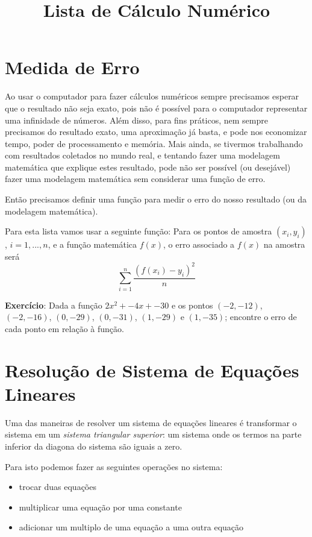 \documentclass[12pt]{article}
\title{Lista de Cálculo Numérico}
\date{}
\begin{document}
\maketitle


\vspace{3em}

\section{Medida de Erro}

Ao usar o computador para fazer cálculos numéricos sempre precisamos esperar que o resultado não seja exato, pois não é possível para o computador representar uma infinidade de números. Além disso, para fins práticos, nem sempre precisamos do resultado exato, uma aproximação já basta, e pode nos economizar tempo, poder de processamento e memória. Mais ainda, se tivermos trabalhando com resultados coletados no mundo real, e tentando fazer uma modelagem matemática que explique estes resultado, pode não ser possível (ou desejável) fazer uma modelagem matemática sem considerar uma função de erro.

Então precisamos definir uma função para medir o erro do nosso resultado (ou da modelagem matemática).

Para esta lista vamos usar a seguinte função: 
Para os pontos de amostra $(x_i, y_i)$, $i = 1, ..., n$, e a função matemática $f(x)$, o erro associado a $f(x)$ na amostra será
\[\sum_{i=1}^{n}\frac{(f(x_i) - y_i)^2}{n}\]

\textbf{Exercício}: Dada a função $2x^2 + -4x + -30$ e os pontos $(-2, -12)$, $(-2, -16)$, $(0, -29)$, $(0, -31)$, $(1, -29)$ e $(1, -35)$; encontre o erro de cada ponto em relação à função.



\break





\section{Resolução de Sistema de Equações Lineares}

Uma das maneiras de resolver um sistema de equações lineares é transformar o sistema em um \textit{sistema triangular superior}: um sistema onde os termos na parte inferior da diagona do sistema são iguais a zero.

Para isto podemos fazer as seguintes operações no sistema:
\begin{itemize}
\item trocar duas equações
\item multiplicar uma equação por uma constante
\item adicionar um multiplo de uma equação a uma outra equação
\end{itemize}
\end{document}
